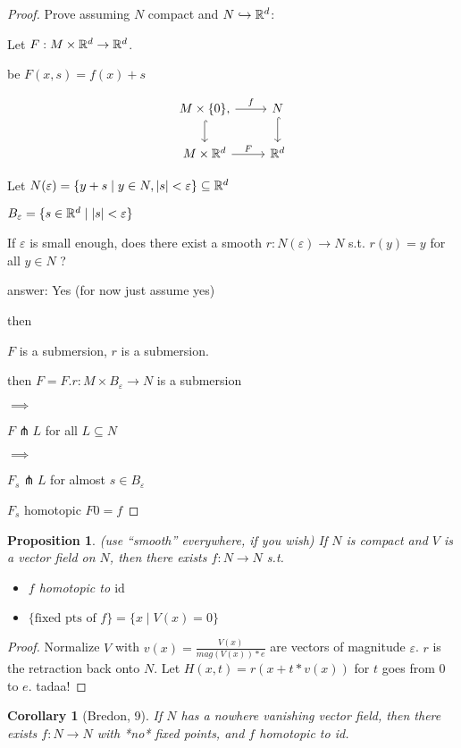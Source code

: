 \documentclass[11pt]{amsbook}
\newenvironment{dateenv}{
	\vspace{1em}
}{
	\vspace{1em}
}
\newcommand{\mydate}[4]{
	\newdate{#1}{#2}{#3}{#4}
	\begin{dateenv}
		\hfill\displaydate{#1}
	\end{dateenv}
}
\theoremstyle{mystyle} \newtheorem{thrm}[thm]{Theorem}
\theoremstyle{mystyle} \newtheorem{defi}[thm]{Definition}
\theoremstyle{mystyle} \newtheorem{coro}[thm]{Corollary}
\theoremstyle{mystyle} \newtheorem{propo}[thm]{Proposition}
\theoremstyle{mystyle} \newtheorem{lemm}[thm]{Lemma}
\numberwithin{thm}{section}
\newcommand{\id}{\text{id}}
\renewcommand{\epsilon}{\varepsilon}
\newcommand{\transverse}{\pitchfork}
\newcommand{\into}{\hookrightarrow}
\newcommand{\x}{\times}
\begin{document}
\begin{proof}
	Prove assuming $N$ compact and $N \into \R^d$:

	Let $\overset{~}{F}: M \x \R^d \to \R^d$.

	be $\overset{~}{F}(x,s) = f(x) + s$

	$$\begin{tikzcd}
		M \x \{0\} \arrow[r, "f"], \arrow[d, hook] & N \arrow[d, hook] \\
		M \x \R^d \arrow[r, "\overset{~}{F}"] & \R^d
	\end{tikzcd}$$

	Let $N(\epsilon) = \{ y+s \mid y \in N, |s| < \epsilon \} \subseteq \R^d$

	$B_{\epsilon} = \{ s \in \R^d \mid |s| < \epsilon \}$

	If $\epsilon$ is small enough, does there exist a smooth $r : N(\epsilon) \to N$ s.t. $r(y) = y$ for all $y \in N$ ?

	answer: Yes (for now just assume yes)

	then

	$\overset{~}{F}$ is a submersion, $r$ is a submersion.

	then $F = \overset{~}{F}.r : M \x B_\epsilon \to N$ is a submersion

	$\implies$

	$F \transverse L$ for all $L \subseteq N$

	$\implies$

	$F_s \transverse L$ for almost $s \in B_\epsilon$

	$F_s$ homotopic $F0 = f$

\end{proof}
\mydate{d10}{7}{11}{2016}
\begin{propo}
	(use ``smooth'' everywhere, if you wish)
	If $N$ is compact and $V$ is a vector field on $N$, then there exists $f: N \to N$ s.t.
	\begin{itemize}
		\item $f$ homotopic to $\id$
		\item $\{ \text{fixed pts of } f \} = \{ x \mid V(x) = 0 \}$
	\end{itemize}
\end{propo}
\begin{proof}
	Normalize $V$ with $v(x) = \frac{V(x)}{mag(V(x))*e}$ are vectors of magnitude $\epsilon$.
	$r$ is the retraction back onto $N$.
	Let $H(x,t) = r(x + t*v(x))$ for $t$ goes from $0$ to $e$.
	tadaa!
\end{proof}
\begin{coro}[Bredon, 9]
	If $N$ has a nowhere vanishing vector field, then there exists $f: N \to N$ with *no* fixed points, and $f$ homotopic to id.
\end{coro}
\end{document}
